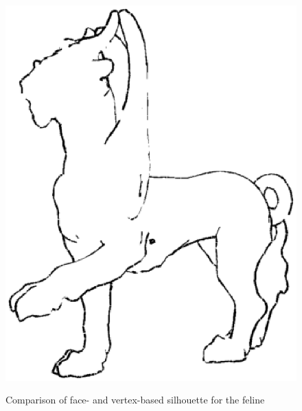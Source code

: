 \documentclass[a4paper,10pt,notitlepage]{scrreprt}
\begin{document}
\begin{figure}
{    \includegraphics[scale=0.35]{img-2-2/feline-vertex.eps}}
 \caption{Comparison of face- and vertex-based silhouette for the feline}
 \label{fig:silhouette-feline}
\end{figure}
\end{document}
